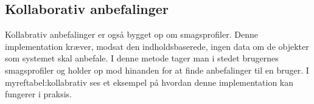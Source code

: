 \subsection{Kollaborativ anbefalinger}
Kollabrativ anbefalinger er også bygget op om smagsprofiler.
Denne implementation kræver, modsat den indholdsbaserede, ingen data om de objekter som systemet skal anbefale.
I denne metode tager man i stedet brugernes smagsprofiler og holder op mod hinanden for at finde anbefalinger til en bruger.
I myref{tabel:kollabrativ} ses et eksempel på hvordan denne implementation kan fungerer i praksis.




